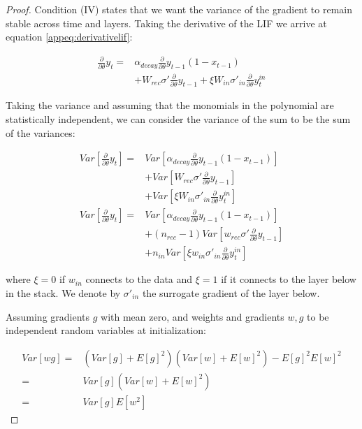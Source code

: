 \begin{proof}


Condition (IV) states that we want the variance of the gradient to remain stable across time and layers.
Taking the derivative of the LIF we arrive at equation \ref{appeq:derivativelif}:

\begin{align}
    \frac{\partial}{\partial \theta}y_t =& \alpha_{decay} \frac{\partial}{\partial \theta}y_{t-1}(1-x_{t-1}) \nonumber \\&+ W_{rec}\sigma'\frac{\partial}{\partial \theta}y_{t-1} + \xi W_{in}\sigma'_{in}\frac{\partial}{\partial \theta}y_{t}^{in}
\end{align}

Taking the variance and assuming that the monomials in the polynomial are statistically independent, we can consider the variance of the sum to be the sum of the variances:

\begin{align}
    Var[\frac{\partial}{\partial \theta}y_t] =& Var[\alpha_{decay} \frac{\partial}{\partial \theta}y_{t-1}(1-x_{t-1})] \nonumber \\&+ Var[W_{rec}\sigma'\frac{\partial}{\partial \theta}y_{t-1}] \nonumber \\&+ Var[\xi W_{in}\sigma'_{in}\frac{\partial}{\partial \theta}y_{t}^{in}] \\
    Var[\frac{\partial}{\partial \theta}y_t] =& Var[\alpha_{decay} \frac{\partial}{\partial \theta}y_{t-1}(1-x_{t-1})] \nonumber \\&+ (n_{rec}-1)Var[w_{rec}\sigma'\frac{\partial}{\partial \theta}y_{t-1}] \nonumber \\&+ n_{in}Var[\xi w_{in}\sigma'_{in}\frac{\partial}{\partial \theta}y_{t}^{in}]
\end{align}

\noindent where $\xi=0$ if $w_{in}$ connects to the data and $\xi=1$ if it connects to the layer below in the stack. We denote by $\sigma'_{in}$  the surrogate gradient of the layer below.  


Assuming gradients $g$ with mean zero, and weights and gradients $w,g$ to be independent random variables at initialization:

\begin{align}
    Var[wg] =& (Var[g] + E[g]^2)(Var[w] + E[w]^2)-E[g]^2E[w]^2 \\
    =& Var[g](Var[w] + E[w]^2) \\
    =&  Var[g] E[w^2]
\end{align}


\end{proof}
